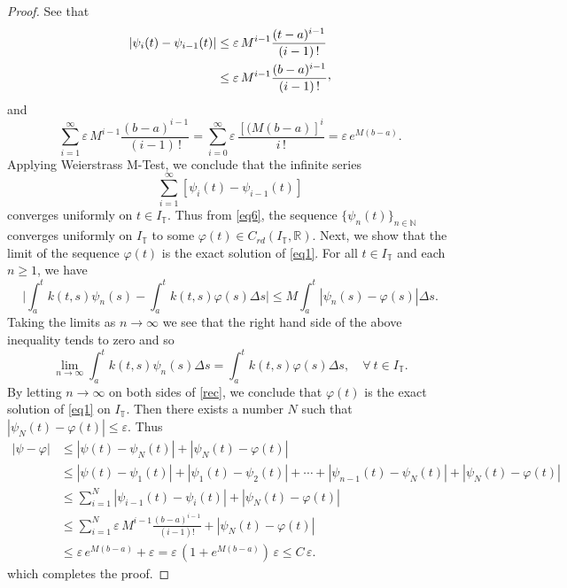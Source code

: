 \documentclass{article}
\newcommand{\q}{\quad}
\newcommand{\CommaBin}{\mathbin{\raisebox{0.5ex}{,}}}
\begin{document}
\begin{proof}
See that
 \begin{align*}
   |\psi_{i}(t)-\psi_{i-1}(t)| &\leq \varepsilon\,M^{i-1}\frac{(t-a)^{i-1}}{(i-1)\,!} \\
    & \leq \varepsilon\,M^{i-1}\frac{(b-a)^{i-1}}{(i-1)\,!}\CommaBin
 \end{align*}
and
 $$
 \sum_{i=1}^\infty\varepsilon\,M^{i-1}\frac{(b-a)^{i-1}}{(i-1)\,!}=\sum_{i=0}^\infty \varepsilon\,\frac{[(M(b-a)]^{i}}{i\,!}=\varepsilon\,e^{M(b-a)}.
 $$
Applying Weierstrass M-Test, we conclude that the infinite series
 $$\sum_{i=1}^{\infty} [\psi_{i}(t)-\psi_{i-1}(t)]$$
converges uniformly on $t\in I_\mathbb{T}$. Thus from \eqref{eq6}, the sequence $\{\psi_{n}(t)\}_{n\in\mathbb{N}}$ converges uniformly on $I_\mathbb{T}$ to some $\varphi(t)\in C_{rd}(I_\mathbb{T},\mathbb{R})$. Next, we show that the limit of the sequence $\varphi(t)$ is the exact solution of \eqref{eq1}. For all $t\in I_\mathbb{T}$ and each $n\geq 1$, we have
 $$
 \Big|\int_a^tk(t,s)\psi_{n}(s)-\int_a^tk(t,s)\varphi(s)\Delta s\Big|\leq M\int_a^t|\psi_{n}(s)-\varphi(s)|\Delta s.
 $$
Taking the limits as $n\rightarrow\infty$ we see that the right hand side of the above inequality tends to zero and so
$$
\lim_{n\rightarrow\infty}\int_a^tk(t,s)\psi_{n}(s)\Delta s=\int_a^tk(t,s)\varphi(s)\Delta s, \q \forall \ t \in I_\mathbb{T}.
$$
By letting $n\rightarrow\infty$ on both sides of \eqref{rec}, we conclude that $\varphi(t)$ is the exact solution of \eqref{eq1} on $I_\mathbb{T}$. Then there exists a number $N$ such that $|\psi_N(t)-\varphi(t)|\leq \varepsilon$. Thus
\begin{align*}
|\psi-\varphi|&\leq |\psi(t)-\psi_N(t)|+|\psi_N(t)-\varphi(t)|\\
&\leq |\psi(t)-\psi_1(t)|+|\psi_1(t)-\psi_2(t)|+\cdots +|\psi_{n-1}(t)-\psi_N(t)|+|\psi_N(t)-\varphi(t)|\\
&\leq \sum_{i=1}^N|\psi_{i-1}(t)-\psi_i(t)|+|\psi_N(t)-\varphi(t)|\\
&\leq \sum_{i=1}^N\varepsilon\,M^{i-1}\frac{(b-a)^{i-1}}{(i-1)!}+|\psi_N(t)-\varphi(t)|\\
&\leq \varepsilon\,e^{M(b-a)}+\varepsilon=\varepsilon\,(1+e^{M(b-a)})\,\varepsilon\leq C\,\varepsilon.
\end{align*}
which completes the proof.
\end{proof}
\end{document}
